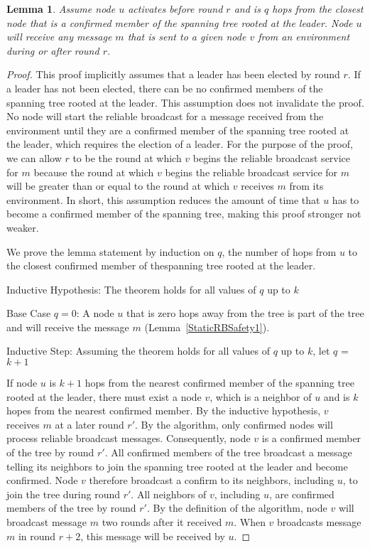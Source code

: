 \documentclass[english]{article}
\newtheorem{lemma}[theorem]{Lemma}
\begin{document}
\begin{lemma}
\label{RBSafety1ByInduction}
  Assume node $u$ activates before round $r$ and is $q$ hops from the closest node that is a confirmed member of the spanning tree rooted at the leader. Node $u$ will receive any message $m$ that is sent to a given node $v$ from an environment during or after round $r$.
\end{lemma}
\begin{proof} This proof implicitly assumes that a leader has been elected by round $r$. If a leader has not been elected, there can be no confirmed members of the spanning tree rooted at the leader. This assumption does not invalidate the proof. No node will start the reliable broadcast for a message received from the environment until they are a confirmed member of the spanning tree rooted at the leader, which requires the election of a leader. For the purpose of the proof, we can allow $r$ to be the round at which $v$ begins the reliable broadcast service for $m$ because the round at which $v$ begins the reliable broadcast service for $m$ will be greater than or equal to the round at which $v$ receives $m$ from its environment. In short, this assumption reduces the amount of time that $u$ has to become a confirmed member of the spanning tree, making this proof stronger not weaker.


We prove the lemma statement by induction on $q$, the number of hops from $u$ to the closest confirmed member of thespanning tree rooted at the leader.


\noindent Inductive Hypothesis: The theorem holds for all values of $q$ up to $k$

\noindent Base Case $q=0$: A node $u$ that is zero hops away from the tree is part of the tree and will receive the message $m$ (Lemma~\ref{StaticRBSafety1}).

\noindent Inductive Step: Assuming the theorem holds for all values of $q$ up to $k$, let $q$ = $k+1$

If node $u$ is $k+1$ hops from the nearest confirmed member of the spanning tree rooted at the leader, there must exist a node $v$, which is a neighbor of $u$ and is $k$ hopes from the nearest confirmed member. By the inductive hypothesis, $v$ receives $m$ at a later round $r'$. By the algorithm, only confirmed nodes will process reliable broadcast messages. Consequently, node $v$ is a confirmed member of the tree by round $r'$. All confirmed members of the tree broadcast a message telling its neighbors to join the spanning tree rooted at the leader and become confirmed. Node $v$ therefore broadcast a confirm to its neighbors, including $u$, to join the tree during round $r'$. All neighbors of $v$, including $u$, are confirmed members of the tree by round $r'$. By the definition of the algorithm, node $v$ will broadcast message $m$ two rounds after it received $m$. When $v$ broadcasts message $m$ in round $r+2$, this message will be received by $u$.

\end{proof}
\end{document}
